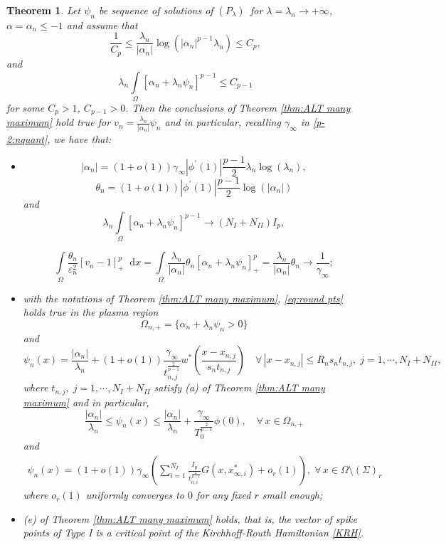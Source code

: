 \documentclass[10pt]{amsart}
\newcommand{\dd}{\mathop{}\!\mathrm{d}}
\newcommand{\eps}{\varepsilon}
\renewcommand{\to}{\rightarrow}
\newcommand{\ii}{\infty}
\newcommand{\al}{\alpha}
\newcommand{\om}{\Omega}
\newcommand{\lm}{\lambda}
\newcommand{\prl}{{$(P_{\lm})$}}
\newtheorem{theorem}{Theorem}[section]
\begin{document}
 \begin{theorem}\label{thm:last} Let $\psi_n$ be sequence of solutions of \prl\, for $\lm=\lm_n\to +\ii$, $\al=\al_n\leq -1$  and assume that
 \begin{equation}\label{H3}
 \frac{1}{C_{p}}\leq \frac{\lm_n}{|\al_n|}\log(|\al_n|^{p-1}\lm_n)\leq C_{p},
 \end{equation}
 and
 \begin{equation}\label{H4}
 \lm_n\int\limits_{\om}[\al_n+\lm_n\psi_n]^{p-1}\leq C_{p-1}
 \end{equation}
 for some $C_p>1$, $C_{p-1}>0$. Then the conclusions of Theorem \ref{thm:ALT many maximum} hold true for $v_n=\frac{\lm_n}{|\al_n|}\psi_n$ and in particular,
 recalling
 $\gamma_\ii$ in \eqref{p-2:nquant}, we have that:
 \begin{itemize}
            \item[(i)]
 $$
 |\al_n|=(1+o(1))\gamma_\ii|\phi^{'}(1)|\frac{p-1}{2}\lm_n\log(\lm_n),
 $$
 $$
 \theta_n=(1+o(1))|\phi^{'}(1)|\frac{p-1}{2}\log(|\al_n|)
 $$
 and
 $$
\lm_n\int\limits_{\om}[\al_n+\lm_n\psi_n]^{p-1}\to (N_I+N_{II}) I_p,
 $$

$$
\int\limits_\Omega \frac{\theta_n}{\eps_n^2}[v_n-1]_+^{p}\dd{x} =
\int\limits_\Omega \frac{\lm_n}{|\al_n|}\theta_n[\al_n+\lm_n\psi_n]_+^{p}=\frac{\lm_n}{|\al_n|}\theta_n\to \frac{1}{\gamma_\ii};
$$

            \item[(ii)] with the notations of Theorem \ref{thm:ALT many maximum},
 \eqref{eq:round pts} holds true in the plasma region $$\om_{n,+}=\{\al_n+\lm_n\psi_n>0\}$$  and
         $$
     \psi_n(x)= \frac{|\al_n|}{\lm_n}+(1+o(1))\frac{\gamma_\ii}{t_{n,j}^{\frac{2}{p-1}}} w^*(\frac{x-x_{n,j}}{s_n t_{n,j}})
     \quad \forall\, |x-x_{n,j}|\leq R_{n}s_nt_{n,j},\;j=1,\cdots,N_I+N_{II},
     $$
       where $t_{n,j},\;j=1,\cdots,N_I+N_{II}$ satisfy {\rm (a)} of Theorem \ref{thm:ALT many maximum} and in particular,
         $$
         \frac{|\al_n|}{\lm_n}\leq \psi_n(x)\leq \frac{|\al_n|}{\lm_n}+\frac{\gamma_\ii}{T_{0}^{\frac{2}{p-1}}}\phi(0),\quad \forall\,x\in \om_{n,+}
         $$
         and
         \begin{align}\label{green:rep}
  \psi_n(x)= {(1+o(1))}\gamma_\ii\left(\sum_{i=1}^{N_I} \frac{I_p}{t_{n,i}^{\frac{2}{p-1}}}G(x,x^*_{\ii,i})+o_r(1)\right),\;\forall\,
  x\in \om\setminus (\Sigma)_r
    \end{align}
where $o_r(1)$ uniformly converges to $0$ for any fixed $r$ small enough;\\

            \item[(iii)] {\rm (e)} of Theorem \ref{thm:ALT many maximum} holds, that is,
            the vector of spike points of Type I is a critical point of the Kirchhoff-Routh Hamiltonian \eqref{KRH}.
\end{itemize}
 \end{theorem}
\end{document}
